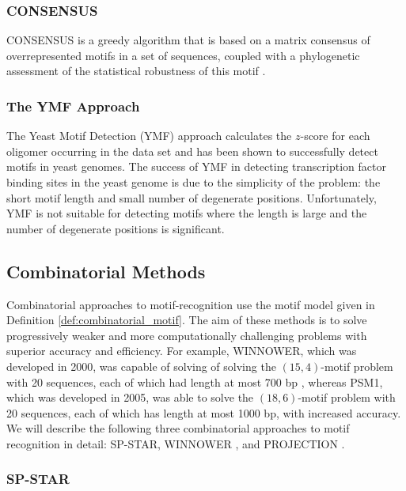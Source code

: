 \subsubsection{CONSENSUS}

CONSENSUS is a greedy algorithm that is based on a matrix consensus of overrepresented motifs in a set of sequences, coupled with a phylogenetic assessment of the statistical robustness of this motif \cite{HS}.

\subsubsection{The YMF Approach}

The Yeast Motif Detection (YMF) approach calculates the $z$-score for each oligomer occurring in the data set and has been shown to successfully detect motifs in yeast genomes. The success of YMF in detecting transcription factor binding sites in the yeast genome is due to the simplicity of the problem: the short motif length and small number of degenerate positions. Unfortunately, YMF is not suitable for detecting motifs where the length is large and the number of degenerate positions is significant.

\subsection{Combinatorial Methods}

Combinatorial approaches to motif-recognition use the motif model given in Definition \ref{def:combinatorial_motif}. The aim of these methods is to solve progressively weaker and more computationally challenging problems with superior accuracy and efficiency. For example, WINNOWER, which was developed in 2000, was capable of solving of solving the $(15,4)$-motif problem with 20 sequences, each of which had length at most 700 bp \cite{PS00}, whereas PSM1, which was developed in 2005, was able to solve the $(18, 6)$-motif problem with 20 sequences, each of which has length at most 1000 bp, with increased accuracy. We will describe the following three combinatorial approaches to motif recognition in detail: SP-STAR, WINNOWER \cite{PS00}, and PROJECTION \cite{BT02}. 

\subsubsection{SP-STAR}
 
